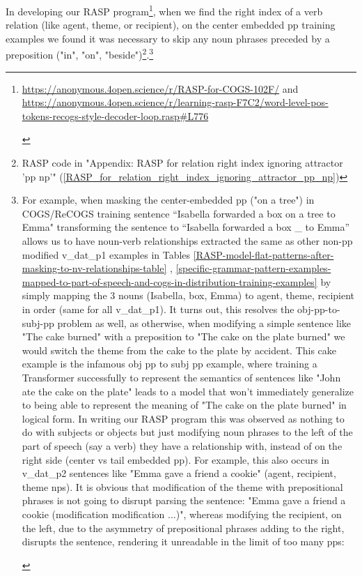 \documentclass[11pt]{article}
\begin{document}
In developing our RASP program\footnote{\begin{footnotesize}\href{https://anonymous.4open.science/r/RASP-for-COGS-102F/}{https://anonymous.4open.science/r/RASP-for-COGS-102F/} and \href{https://anonymous.4open.science/r/learning-rasp-F7C2/word-level-pos-tokens-recogs-style-decoder-loop.rasp\#L776}{https://anonymous.4open.science/r/learning-rasp-F7C2/word-level-pos-tokens-recogs-style-decoder-loop.rasp\#L776}\end{footnotesize}},
when we find the right index of a verb relation (like agent, theme, or recipient), 
on the center embedded pp training examples we found it was necessary to skip any noun phrases preceded by a preposition ("in", "on", "beside")\footnote{RASP code in "Appendix: RASP for relation right index ignoring attractor 'pp np'" (\ref{RASP_for_relation_right_index_ignoring_attractor_pp_np})}.\footnote{\begin{footnotesize}
For example, when masking the center-embedded pp ("on a tree") in COGS/ReCOGS training sentence “Isabella forwarded a box on a tree to Emma" transforming the sentence to “Isabella forwarded a box \_ to Emma” allows us to have noun-verb relationships extracted the same as other non-pp modified v\_dat\_p1 examples in Tables \ref{RASP-model-flat-patterns-after-masking-to-nv-relationships-table} , \ref{specific-grammar-pattern-examples-mapped-to-part-of-speech-and-cogs-in-distribution-training-examples} by simply mapping the 3 nouns (Isabella, box, Emma) to agent, theme, recipient in order (same for all v\_dat\_p1).
It turns out, this resolves the obj-pp-to-subj-pp problem as well, as otherwise, when modifying a simple sentence like "The cake burned" with a preposition to "The cake on the plate burned" we would switch the theme from the cake to the plate by accident. This cake example is the infamous obj pp to subj pp example, where training a Transformer successfully to represent the semantics of sentences like "John ate the cake on the plate" leads to a model that won't immediately generalize to being able to represent the meaning of "The cake on the plate burned" in logical form.
In writing our RASP program this was observed as nothing to do with subjects or objects but just modifying noun phrases to the left of the part of speech (say a verb) they have a relationship with, instead of on the right side (center vs tail embedded pp). For example, this also occurs in v\_dat\_p2 sentences like "Emma gave a friend a cookie" (agent, recipient, theme nps). It is obvious that modification of the theme with prepositional phrases is not going to disrupt parsing the sentence: "Emma gave a friend a cookie (modification modification ...)", whereas modifying the recipient, on the left, due to the asymmetry of prepositional phrases adding to the right, disrupts the sentence, rendering it unreadable in the limit of too many pps:


\end{footnotesize}}
\end{document}
